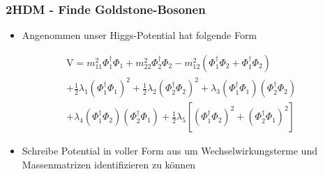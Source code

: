 \documentclass[xcolor=dvipsnames]{beamer}
\begin{document}
\begin{frame}[t]
\frametitle{2HDM - Finde Goldstone-Bosonen}
\begin{itemize}
\item Angenommen unser Higgs-Potential hat folgende Form
\end{itemize}
\begin{equation*}
\begin{split}
\text{V}=m_{11}^{2} \Phi_{1}^{\dagger}\Phi_{1}+m_{22}^{2} \Phi_{2}^{\dagger}\Phi_{2} -m_{12}^{2}( \Phi_{1}^{\dagger}\Phi_{2} +\Phi_{1}^{\dagger}\Phi_{2}) \\+ \frac{1}{2} \lambda_{1} (\Phi_{1}^{\dagger}\Phi_{1})^{2}+ \frac{1}{2} \lambda_{2} (\Phi_{2}^{\dagger}\Phi_{2})^{2}+ \lambda_{3}( \Phi_{1}^{\dagger}\Phi_{1})(\Phi_{2}^{\dagger}\Phi_{2} ) \\+\lambda_{4}( \Phi_{1}^{\dagger}\Phi_{2})(\Phi_{2}^{\dagger}\Phi_{1} ) +\frac{1}{2} \lambda_{5}[( \Phi_{1}^{\dagger}\Phi_{2})^{2}+(\Phi_{2}^{\dagger}\Phi_{1} )^{2}]
\end{split}
\end{equation*}
\begin{itemize}
\item Schreibe Potential in voller Form aus um Wechselwirkungsterme und Massenmatrizen identifizieren zu können 
\end{itemize} 
\end{frame}
\end{document}
